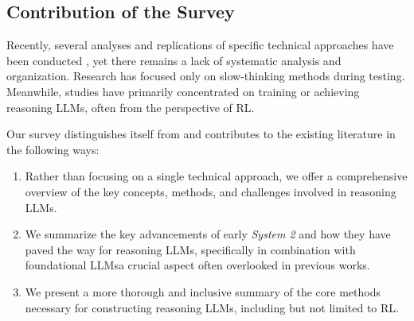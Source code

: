      



\subsection{Contribution of the Survey}




Recently, several analyses and replications of specific technical approaches have been conducted \cite{Compare_o1, TowardsSystem2ReasoninLLM, o1_Journey_Part1, o1_Journey_Part2, huang2025o1, Slow_Thinking_with_LLMs_2, RedStar, Scaling_of_Search_Learning}, yet there remains a lack of systematic analysis and organization. 
Research \cite{Test_Time_Computing} has focused only on slow-thinking methods during testing. 
Meanwhile, studies \cite{besta2025reasoning, zhang2024llm, LargeReasonModel} have primarily concentrated on training or achieving reasoning LLMs, often from the perspective of RL.

Our survey distinguishes itself from and contributes to the existing literature in the following ways:
\begin{enumerate}[itemindent=0em]
\item Rather than focusing on a single technical approach, we offer a comprehensive overview of the key concepts, methods, and challenges involved in reasoning LLMs.

\item We summarize the key advancements of early \textit{System 2} and how they have paved the way for reasoning LLMs, specifically in combination with foundational LLMs\textendash a crucial aspect often overlooked in previous works.

\item We present a more thorough and inclusive summary of the core methods necessary for constructing reasoning LLMs, including but not limited to RL.

\end{enumerate}






